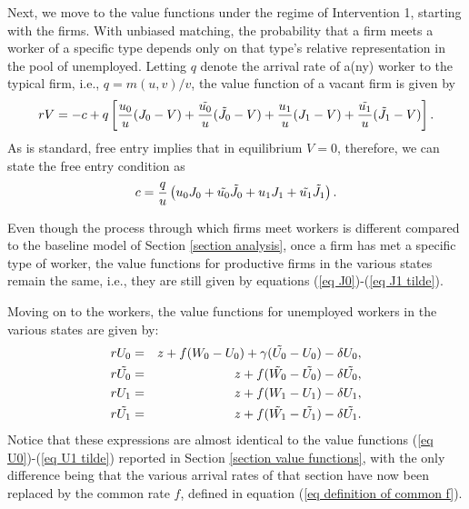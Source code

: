\documentclass[12pt]{article} %
\theoremstyle{definition}
\begin{document}
\noindent Next, we move to the value functions under the regime of Intervention 1, starting with the firms. With unbiased matching, the probability that a firm meets a worker of a specific type depends only on that type's relative representation in the pool of unemployed. Letting $q$ denote the arrival rate of a(ny) worker to the typical firm, i.e., $q=m(u,v)/v$, the value function of a vacant firm is given by 
\begin{equation}
   rV = -c + q \left[\frac{u_0}{u}(J_0-V) + \frac{\Tilde{u_0}}{u}(\Tilde{J_0}-V) + \frac{u_1}{u}(J_1-V) +  \frac{\Tilde{u_1}}{u}(\Tilde{J_1}-V) \right].\nonumber 
\end{equation}As is standard, free entry implies that in equilibrium $V=0$, therefore, we can state the free entry condition as 
\begin{equation}
 c = \frac{q}{u} \left({u_0} J_0 + \Tilde{u_0} \Tilde{J_0} + {u_1} J_1 +  \Tilde{u_1} \Tilde{J_1} \right).\label{eq free entry intervention 1} 
\end{equation}

Even though the process through which firms meet workers is different compared to the baseline model of Section \ref{section analysis}, once a firm has met a specific type of worker, the value functions for productive firms in the various states remain the same, i.e., they are still given by equations (\ref{eq J0})-(\ref{eq J1 tilde}). 

Moving on to the workers, the value functions for unemployed workers in the various states are given by: 
\begin{eqnarray}
    rU_0 &=& z+f(W_0-U_0)+\gamma(\Tilde{U_0}-U_0) - \delta U_0, \label{eq U0 inter 1}  \\
    r\Tilde{U_0} &=& z+{f}(\Tilde{W_0}-\Tilde{U_0})- \delta \Tilde{U_0}, \label{eq U0 tilde inter 1}\\
    rU_1 &=& z+f(W_1-U_1)- \delta U_1, \label{eq U1 inter 1}\\
    r\Tilde{U_1} &=& z+{f}(\Tilde{W_1}-\Tilde{U_1})- \delta \Tilde{U_1}.\label{eq U1 tilde inter 1}
\end{eqnarray}Notice that these expressions are almost identical to the value functions (\ref{eq U0})-(\ref{eq U1 tilde}) reported in Section \ref{section value functions}, with the only difference being that the various arrival rates of that section have now been replaced by the common rate $f$, defined in equation (\ref{eq definition of common f}). 
\end{document}
